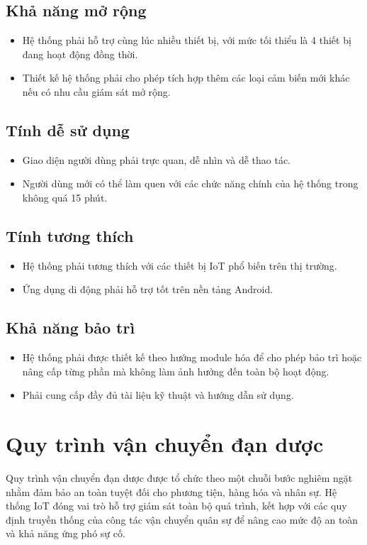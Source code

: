 \subsection{Khả năng mở rộng}
\begin{itemize}
    \item Hệ thống phải hỗ trợ cùng lúc nhiều thiết bị, với mức tối thiểu là 4 thiết bị đang hoạt động đồng thời.
    \item Thiết kế hệ thống phải cho phép tích hợp thêm các loại cảm biến mới khác nếu có nhu cầu giám sát mở rộng.
\end{itemize}

\subsection{Tính dễ sử dụng}
\begin{itemize}
    \item Giao diện người dùng phải trực quan, dễ nhìn và dễ thao tác.
    \item Người dùng mới có thể làm quen với các chức năng chính của hệ thống trong không quá 15 phút.
\end{itemize}

\subsection{Tính tương thích}
\begin{itemize}
    \item Hệ thống phải tương thích với các thiết bị IoT phổ biến trên thị trường.
    \item Ứng dụng di động phải hỗ trợ tốt trên nền tảng Android.
\end{itemize}

\subsection{Khả năng bảo trì}
\begin{itemize}
    \item Hệ thống phải được thiết kế theo hướng module hóa để cho phép bảo trì hoặc nâng cấp từng phần mà không làm ảnh hưởng đến toàn bộ hoạt động.
    \item Phải cung cấp đầy đủ tài liệu kỹ thuật và hướng dẫn sử dụng.
\end{itemize}
\section{Quy trình vận chuyển đạn dược}
Quy trình vận chuyển đạn dược được tổ chức theo một chuỗi bước nghiêm ngặt nhằm đảm bảo an toàn tuyệt đối cho phương tiện, hàng hóa và nhân sự. Hệ thống IoT đóng vai trò hỗ trợ giám sát toàn bộ quá trình, kết hợp với các quy định truyền thống của công tác vận chuyển quân sự để nâng cao mức độ an toàn và khả năng ứng phó sự cố.

